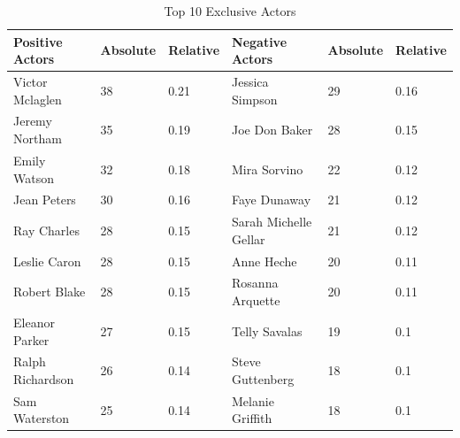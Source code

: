 \documentclass[
10pt, %
a4paper, %
oneside, %
headinclude,footinclude, %
] {book}%
\begin{document}
\begin{table}[hbtp]
\centering
\caption{Top 10 Exclusive Actors}
\label{Table 8}
\begin{tabular}{llllll}
\toprule
Positive Actors  & Absolute & Relative & Negative Actors       & Absolute & Relative \\ \midrule
Victor Mclaglen  & 38       & 0.21     & Jessica Simpson       & 29       & 0.16     \\
Jeremy Northam   & 35       & 0.19     & Joe Don Baker         & 28       & 0.15     \\
Emily Watson     & 32       & 0.18     & Mira Sorvino          & 22       & 0.12     \\
Jean Peters      & 30       & 0.16     & Faye Dunaway          & 21       & 0.12     \\
Ray Charles      & 28       & 0.15     & Sarah Michelle Gellar & 21       & 0.12     \\
Leslie Caron     & 28       & 0.15     & Anne Heche            & 20       & 0.11     \\
Robert Blake     & 28       & 0.15     & Rosanna Arquette      & 20       & 0.11     \\
Eleanor Parker   & 27       & 0.15     & Telly Savalas         & 19       & 0.1     \\
Ralph Richardson & 26       & 0.14     & Steve Guttenberg      & 18       & 0.1     \\
Sam Waterston    & 25       & 0.14     & Melanie Griffith      & 18       & 0.1     \\ \bottomrule
\end{tabular}
\end{table}
\end{document}
